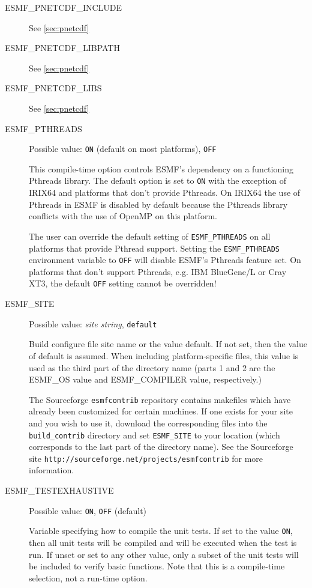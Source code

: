 \begin{description}
\item[ESMF\_PNETCDF\_INCLUDE]
See \ref{sec:pnetcdf}

\item[ESMF\_PNETCDF\_LIBPATH]
See \ref{sec:pnetcdf}

\item[ESMF\_PNETCDF\_LIBS]
See \ref{sec:pnetcdf}

\item[ESMF\_PTHREADS]
Possible value: {\tt ON} (default on most platforms), {\tt OFF}

This compile-time option controls ESMF's dependency on a functioning
Pthreads library. The default option is set to {\tt ON} with the exception
of IRIX64 and platforms that don't provide Pthreads. On IRIX64 the use of
Pthreads in ESMF is disabled by default because the Pthreads library conflicts
with the use of OpenMP on this platform.

The user can override the default setting of {\tt ESMF\_PTHREADS} on all
platforms that provide Pthread support. Setting the {\tt ESMF\_PTHREADS}
environment variable to {\tt OFF} will disable ESMF's Pthreads feature set.
On platforms that don't support Pthreads, e.g. IBM BlueGene/L or Cray XT3, the
default {\tt OFF} setting cannot be overridden!
 
\item[ESMF\_SITE]
Possible value: {\em site string}, {\tt default}

Build configure file site name or the value default. If not set, then the value
of default is assumed. When including platform-specific files, this value is 
used as the third part of the directory name (parts 1 and 2 are the
ESMF\_OS value and ESMF\_COMPILER value, respectively.)

The Sourceforge {\tt esmfcontrib} repository contains makefiles which have 
already been customized for certain machines.  If one exists for your site 
and you wish to use it, download the corresponding files into the 
{\tt build\_contrib} directory and set {\tt ESMF\_SITE} to your location
(which corresponds to the last part of the directory name).  See the 
Sourceforge site {\tt http://sourceforge.net/projects/esmfcontrib} for more 
information.

\item[ESMF\_TESTEXHAUSTIVE] 
Possible value: {\tt ON}, {\tt OFF} (default)

Variable specifying how to compile the unit tests. If set to the value {\tt ON},
then all unit tests will be compiled and will be executed when the test is
run.  If unset or set to any other value, only a subset of the unit tests
will be included to verify basic functions. Note that this is a compile-time
selection, not a run-time option.


\end{description}
